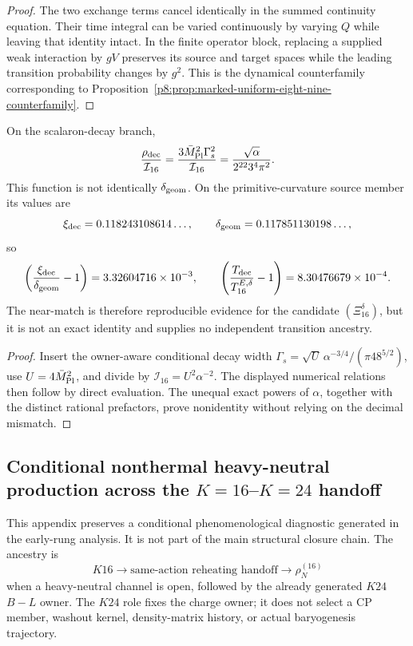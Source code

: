 \documentclass[12pt,a4paper]{article}
\begin{document}
\begin{proof}
The two exchange terms cancel identically in the summed continuity equation.
Their time integral can be varied continuously by varying \(Q\) while leaving
that identity intact.  In the finite operator block, replacing a supplied
weak interaction by \(gV\) preserves its source and target spaces while the
leading transition probability changes by \(g^2\).  This is the dynamical
counterfamily corresponding to
Proposition~\ref{p8:prop:marked-uniform-eight-nine-counterfamily}.
\end{proof}

\begin{proposition}
\label{p8:prop:k16-decay-direct-near-match-status}
On the scalaron-decay branch,
\[
 \frac{\rho_{\rm dec}}{\mathcal I_{16}}
 =\frac{3\bar M_{\rm Pl}^{2}\Gamma_s^2}{\mathcal I_{16}}
 =\frac{\sqrt\alpha}{2^{22}3^4\pi^2}.
\]
This function is not identically \(\delta_{\rm geom}\).  On the primitive-curvature source member its values are
\[
 \xi_{\rm dec}=0.118243108614\ldots,
 \qquad
 \delta_{\rm geom}=0.117851130198\ldots,
\]
so
\[
 \left(\frac{\xi_{\rm dec}}{\delta_{\rm geom}}-1\right)
 =3.32604716\times10^{-3},
 \qquad
 \left(\frac{T_{\rm dec}}{T_{16}^{E,\delta}}-1\right)
 =8.30476679\times10^{-4}.
\]
The near-match is therefore reproducible evidence for the candidate
\((\Xi_{16}^{\delta})\), but it is not an exact identity and supplies no
independent transition ancestry.
\end{proposition}

\begin{proof}
Insert the owner-aware conditional decay width
\(\Gamma_s=\sqrt U\,
\alpha^{-3/4}/(\pi48^{5/2})\), use
\(U=4\bar M_{\rm Pl}^{2}\), and divide by
\(\mathcal I_{16}=U^2\alpha^{-2}\).  The displayed numerical
relations then follow by direct evaluation.  The unequal exact powers of
\(\alpha\), together with the distinct rational prefactors, prove
nonidentity without relying on the decimal mismatch.
\end{proof}

\subsection{Conditional nonthermal heavy-neutral production across the \(K=16\)--\(K=24\) handoff}
\label{p8:app:v285-k16-k24-nonthermal-baryogenesis}

This appendix preserves a conditional phenomenological diagnostic generated
in the early-rung analysis.  It is not part of the main structural closure
chain.  The ancestry is
\[
 K16\longrightarrow\text{same-action reheating handoff}
 \longrightarrow\rho_N^{(16)}
\]
when a heavy-neutral channel is open, followed by the already generated
\(K24\) \(B-L\) owner.  The \(K24\) role fixes the charge owner; it does not
select a CP member, washout kernel, density-matrix history, or actual
baryogenesis trajectory.
\end{document}

